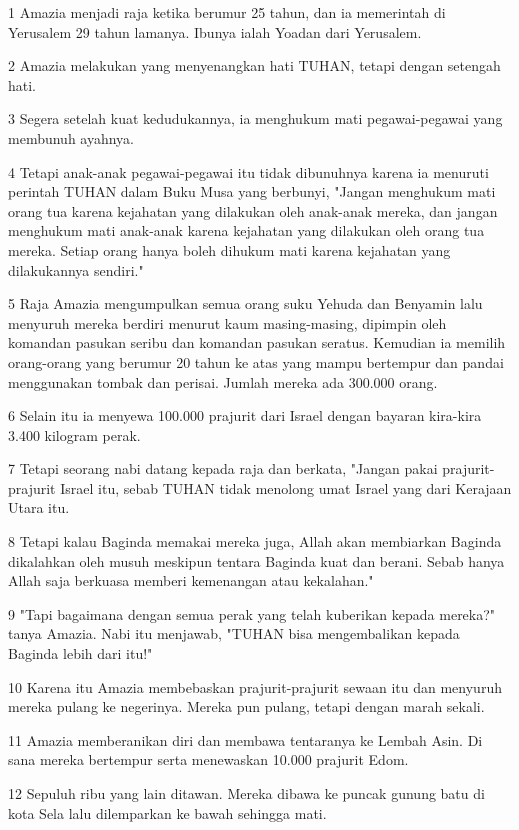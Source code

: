 \par 1 Amazia menjadi raja ketika berumur 25 tahun, dan ia memerintah di Yerusalem 29 tahun lamanya. Ibunya ialah Yoadan dari Yerusalem.
\par 2 Amazia melakukan yang menyenangkan hati TUHAN, tetapi dengan setengah hati.
\par 3 Segera setelah kuat kedudukannya, ia menghukum mati pegawai-pegawai yang membunuh ayahnya.
\par 4 Tetapi anak-anak pegawai-pegawai itu tidak dibunuhnya karena ia menuruti perintah TUHAN dalam Buku Musa yang berbunyi, "Jangan menghukum mati orang tua karena kejahatan yang dilakukan oleh anak-anak mereka, dan jangan menghukum mati anak-anak karena kejahatan yang dilakukan oleh orang tua mereka. Setiap orang hanya boleh dihukum mati karena kejahatan yang dilakukannya sendiri."
\par 5 Raja Amazia mengumpulkan semua orang suku Yehuda dan Benyamin lalu menyuruh mereka berdiri menurut kaum masing-masing, dipimpin oleh komandan pasukan seribu dan komandan pasukan seratus. Kemudian ia memilih orang-orang yang berumur 20 tahun ke atas yang mampu bertempur dan pandai menggunakan tombak dan perisai. Jumlah mereka ada 300.000 orang.
\par 6 Selain itu ia menyewa 100.000 prajurit dari Israel dengan bayaran kira-kira 3.400 kilogram perak.
\par 7 Tetapi seorang nabi datang kepada raja dan berkata, "Jangan pakai prajurit-prajurit Israel itu, sebab TUHAN tidak menolong umat Israel yang dari Kerajaan Utara itu.
\par 8 Tetapi kalau Baginda memakai mereka juga, Allah akan membiarkan Baginda dikalahkan oleh musuh meskipun tentara Baginda kuat dan berani. Sebab hanya Allah saja berkuasa memberi kemenangan atau kekalahan."
\par 9 "Tapi bagaimana dengan semua perak yang telah kuberikan kepada mereka?" tanya Amazia. Nabi itu menjawab, "TUHAN bisa mengembalikan kepada Baginda lebih dari itu!"
\par 10 Karena itu Amazia membebaskan prajurit-prajurit sewaan itu dan menyuruh mereka pulang ke negerinya. Mereka pun pulang, tetapi dengan marah sekali.
\par 11 Amazia memberanikan diri dan membawa tentaranya ke Lembah Asin. Di sana mereka bertempur serta menewaskan 10.000 prajurit Edom.
\par 12 Sepuluh ribu yang lain ditawan. Mereka dibawa ke puncak gunung batu di kota Sela lalu dilemparkan ke bawah sehingga mati.

